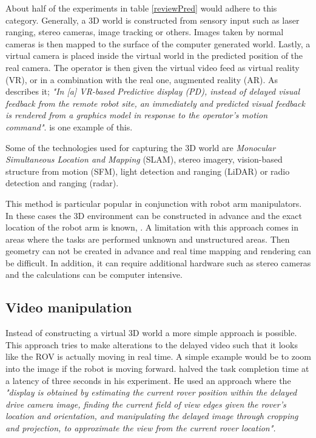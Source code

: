 About half of the experiments in table \ref{reviewPred} would adhere to this category. Generally, a 3D world is constructed from sensory input such as laser ranging, stereo cameras, image tracking or others. Images taken by normal cameras is then mapped to the surface of the computer generated world. Lastly, a virtual camera is placed inside the virtual world in the predicted position of the real camera. The operator is then given the virtual video feed as virtual reality (VR), or in a combination with the real one, augmented reality (AR). As \citep{Hu2016} describes it; \textit{"In [a] VR-based Predictive display (PD), instead of delayed visual feedback from the remote robot site, an immediately and predicted visual feedback is rendered from a graphics model in response to the operator's motion command"}. \citep{Kim1993} is one example of this.

Some of the technologies used for capturing the 3D world are \textit{Monocular Simultaneous Location and Mapping} (SLAM), stereo imagery, vision-based structure from motion (SFM), light detection and ranging (LiDAR) or radio detection and ranging (radar).

This method is particular popular in conjunction with robot arm manipulators. In these cases the 3D environment can be constructed in advance and the exact location of the robot arm is known, \citep{Ricks2004}. A limitation with this approach comes in areas where the tasks are performed unknown and unstructured areas. Then geometry can not be created in advance and real time mapping and rendering can be difficult. In addition, it can require additional hardware such as stereo cameras and the calculations can be computer intensive.



\subsection{Video manipulation}

Instead of constructing a virtual 3D world a more simple approach is possible. This approach tries to make alterations to the delayed video such that it looks like the ROV is actually moving in real time. A simple example would be to zoom into the image if the robot is moving forward. \citep{Matheson2013} halved the task completion time at a latency of three seconds in his experiment. He used an approach where the \textit{"display is obtained by estimating the current rover position within the delayed drive camera image, finding the current field of view edges given the rover’s location and orientation, and manipulating the delayed image through cropping and projection, to approximate the view from the current rover location".}

